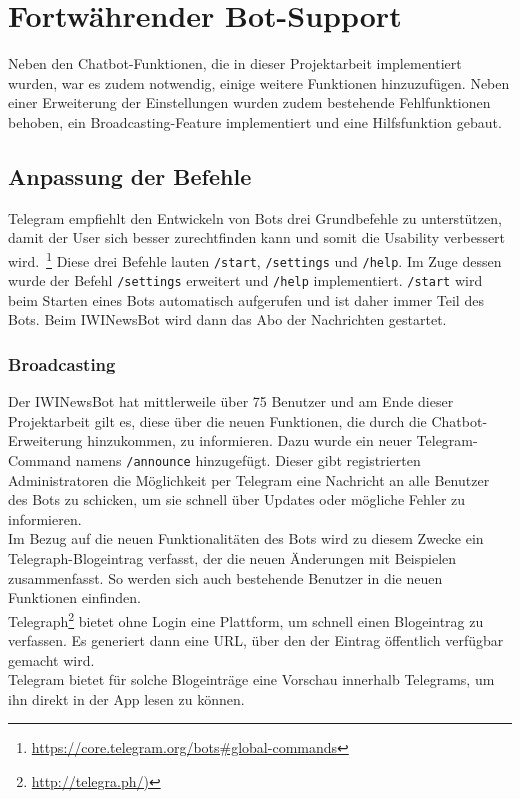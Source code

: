 \chapter{Fortwährender Bot-Support}
Neben den Chatbot-Funktionen, die in dieser Projektarbeit implementiert wurden, war es zudem notwendig, einige weitere Funktionen hinzuzufügen. Neben einer Erweiterung der Einstellungen wurden zudem bestehende Fehlfunktionen behoben, ein Broadcasting-Feature implementiert und eine Hilfsfunktion gebaut.

\section{Anpassung der Befehle}\label{sec:commands}
Telegram empfiehlt den Entwickeln von Bots drei Grundbefehle zu unterstützen, damit der User sich besser zurechtfinden kann und somit die Usability verbessert wird.~\footnote{\url{https://core.telegram.org/bots\#global-commands}}
Diese drei Befehle lauten \texttt{/start}, \texttt{/settings} und \texttt{/help}. Im Zuge dessen wurde der Befehl \texttt{/settings} erweitert und \texttt{/help} implementiert. \texttt{/start} wird beim Starten eines Bots automatisch aufgerufen und ist daher immer Teil des Bots. Beim IWINewsBot wird dann das Abo der Nachrichten gestartet.

\subsection{Broadcasting}
Der IWINewsBot hat mittlerweile über 75 Benutzer und am Ende dieser Projektarbeit gilt es, diese über die neuen Funktionen, die durch die Chatbot-Erweiterung hinzukommen, zu informieren. Dazu wurde ein neuer Telegram-Command namens \texttt{/announce} hinzugefügt. Dieser gibt registrierten Administratoren die Möglichkeit per Telegram eine Nachricht an alle Benutzer des Bots zu schicken, um sie schnell über Updates oder mögliche Fehler zu informieren. \\
Im Bezug auf die neuen Funktionalitäten des Bots wird zu diesem Zwecke ein Telegraph-Blogeintrag verfasst, der die neuen Änderungen mit Beispielen zusammenfasst. So werden sich auch bestehende Benutzer in die neuen Funktionen einfinden. \\
Telegraph\footnote{\url{http://telegra.ph/)}} bietet ohne Login eine Plattform, um schnell einen Blogeintrag zu verfassen. Es generiert dann eine URL, über den der Eintrag öffentlich verfügbar gemacht wird. \\
Telegram bietet für solche Blogeinträge eine Vorschau innerhalb Telegrams, um ihn direkt in der App lesen zu können.

